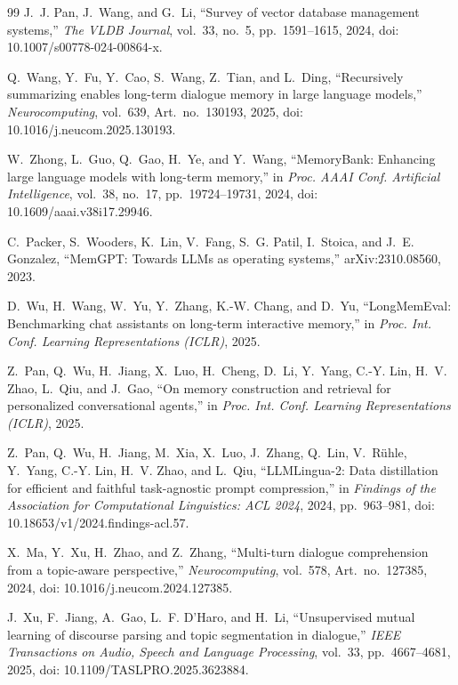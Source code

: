 \documentclass[conference]{IEEEtran}
\begin{document}
\begin{thebibliography}{99}
J.~J. Pan, J.~Wang, and G.~Li, ``Survey of vector database management systems,'' \emph{The VLDB Journal}, vol.~33, no.~5, pp.~1591--1615, 2024, doi: 10.1007/s00778-024-00864-x.

Q.~Wang, Y.~Fu, Y.~Cao, S.~Wang, Z.~Tian, and L.~Ding, ``Recursively summarizing enables long-term dialogue memory in large language models,'' \emph{Neurocomputing}, vol.~639, Art.~no.~130193, 2025, doi: 10.1016/j.neucom.2025.130193.

W.~Zhong, L.~Guo, Q.~Gao, H.~Ye, and Y.~Wang, ``MemoryBank: Enhancing large language models with long-term memory,'' in \emph{Proc. AAAI Conf. Artificial Intelligence}, vol.~38, no.~17, pp.~19724--19731, 2024, doi: 10.1609/aaai.v38i17.29946.

C.~Packer, S.~Wooders, K.~Lin, V.~Fang, S.~G. Patil, I.~Stoica, and J.~E. Gonzalez, ``MemGPT: Towards LLMs as operating systems,'' arXiv:2310.08560, 2023.

D.~Wu, H.~Wang, W.~Yu, Y.~Zhang, K.-W. Chang, and D.~Yu, ``LongMemEval: Benchmarking chat assistants on long-term interactive memory,'' in \emph{Proc. Int. Conf. Learning Representations (ICLR)}, 2025.

Z.~Pan, Q.~Wu, H.~Jiang, X.~Luo, H.~Cheng, D.~Li, Y.~Yang, C.-Y. Lin, H.~V. Zhao, L.~Qiu, and J.~Gao, ``On memory construction and retrieval for personalized conversational agents,'' in \emph{Proc. Int. Conf. Learning Representations (ICLR)}, 2025.

Z.~Pan, Q.~Wu, H.~Jiang, M.~Xia, X.~Luo, J.~Zhang, Q.~Lin, V.~R{\"u}hle, Y.~Yang, C.-Y. Lin, H.~V. Zhao, and L.~Qiu, ``LLMLingua-2: Data distillation for efficient and faithful task-agnostic prompt compression,'' in \emph{Findings of the Association for Computational Linguistics: ACL 2024}, 2024, pp.~963--981, doi: 10.18653/v1/2024.findings-acl.57.

X.~Ma, Y.~Xu, H.~Zhao, and Z.~Zhang, ``Multi-turn dialogue comprehension from a topic-aware perspective,'' \emph{Neurocomputing}, vol.~578, Art.~no.~127385, 2024, doi: 10.1016/j.neucom.2024.127385.

J.~Xu, F.~Jiang, A.~Gao, L.~F. D'Haro, and H.~Li, ``Unsupervised mutual learning of discourse parsing and topic segmentation in dialogue,'' \emph{IEEE Transactions on Audio, Speech and Language Processing}, vol.~33, pp.~4667--4681, 2025, doi: 10.1109/TASLPRO.2025.3623884.


\end{thebibliography}
\end{document}
